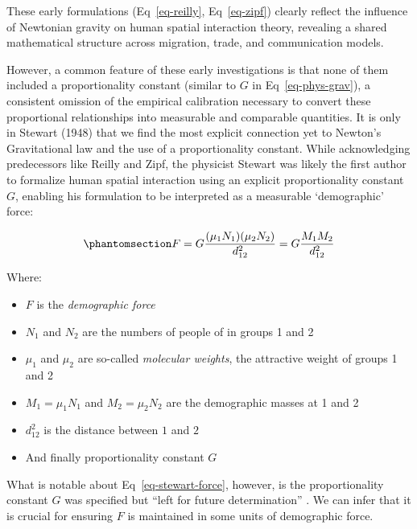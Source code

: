\documentclass[
  10pt,
  letterpaper,
]{article}
\providecommand{\tightlist}{%
  \setlength{\itemsep}{0pt}\setlength{\parskip}{0pt}}
\begin{document}
These early formulations (Eq~\ref{eq-reilly}, Eq~\ref{eq-zipf}) clearly
reflect the influence of Newtonian gravity on human spatial interaction
theory, revealing a shared mathematical structure across migration,
trade, and communication models.

However, a common feature of these early investigations is that none of
them included a proportionality constant (similar to \(G\) in
Eq~\ref{eq-phys-grav}), a consistent omission of the empirical
calibration necessary to convert these proportional relationships into
measurable and comparable quantities. It is only in Stewart (1948)
\citep{stewartDemographicGravitationEvidence1948} that we find the most
explicit connection yet to Newton's Gravitational law and the use of a
proportionality constant. While acknowledging predecessors like Reilly
and Zipf, the physicist Stewart was likely the first author to formalize
human spatial interaction using an explicit proportionality constant
\(G\), enabling his formulation to be interpreted as a measurable
`demographic' force:

\begin{equation}\phantomsection\label{eq-stewart-force}{
F = G\frac{(\mu_1N_1)(\mu_2N_2)}{d_{12}^2} = G\frac{M_1 M_2}{d_{12}^2} 
}\end{equation}

\noindent Where:

\begin{itemize}
\tightlist
\item
  \(F\) is the \emph{demographic force}
\item
  \(N_1\) and \(N_2\) are the numbers of people of in groups 1 and 2
\item
  \(\mu_1\) and \(\mu_2\) are so-called \emph{molecular weights}, the
  attractive weight of groups 1 and 2
\item
  \(M_1 = \mu_1N_1\) and \(M_2 = \mu_2N_2\) are the demographic masses
  at 1 and 2
\item
  \(d_{12}^2\) is the distance between \(1\) and \(2\)
\item
  And finally proportionality constant \(G\)
\end{itemize}

What is notable about Eq~\ref{eq-stewart-force}, however, is the
proportionality constant \(G\) was specified but ``left for future
determination''
\citep[p.~34]{stewartDemographicGravitationEvidence1948}. We can infer
that it is crucial for ensuring \(F\) is maintained in some units of
demographic force.
\end{document}
